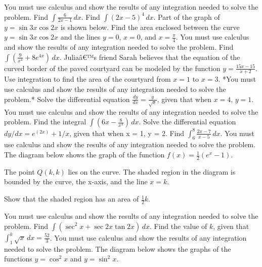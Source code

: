 \documentclass[12pt,addpoints]{exam}
\begin{document}
\begin{questions}
You must use calculus and show the results of any integration needed to solve the problem.
\fillwithlines{3cm}
\question[5] Find \(\int \frac{6}{2x-1} \, dx\).
\fillwithlines{3cm}
\question[5] Find \(\int (2x-5)^4 \, dx\).
\fillwithlines{3cm}
\question[5] Part of the graph of \( y = \sin 3x \cos 2x \) is shown below. Find the area enclosed between the curve \( y = \sin 3x \cos 2x \) and the lines \( y = 0 \), \( x = 0 \), and \( x = \frac{\pi}{4} \). You must use calculus and show the results of any integration needed to solve the problem.
\fillwithlines{3cm}
\question[5] Find \(\int \left( \frac{9}{x^4} + 8e^{4x} \right) \, dx\).
\fillwithlines{3cm}
\question[5] Juliaâ€™s friend Sarah believes that the equation of the curved border of the paved courtyard can be modeled by the function \( y = \frac{15x - 15}{x + 2} \). Use integration to find the area of the courtyard from \( x = 1 \) to \( x = 3 \). *You must use calculus and show the results of any integration needed to solve the problem.*
\fillwithlines{3cm}
\question[5] Solve the differential equation \(\frac{dy}{dx} = \frac{y}{\sqrt{x}}\), given that when \(x = 4\), \(y = 1\). You must use calculus and show the results of any integration needed to solve the problem.
\fillwithlines{3cm}
\question[5] Find the integral \(\int \left( 6x - \frac{8}{x^3} \right) \, dx\).
\fillwithlines{3cm}
\question[5] Solve the differential equation \(dy/dx = e^(2x) + 1/x\), given that when x = 1, y = 2.
\fillwithlines{3cm}
\question[5] Find \(\int_{6}^{8} \frac{2x - 7}{x - 5} \, dx\). You must use calculus and show the results of any integration needed to solve the problem.
\fillwithlines{3cm}
\question[5] The diagram below shows the graph of the function \( f(x) = \frac{1}{2} (e^x - 1) \).

The point \( Q(k, k) \) lies on the curve.  
The shaded region in the diagram is bounded by the curve, the x-axis, and the line \( x = k \).

Show that the shaded region has an area of \( \frac{1}{2} k \).

You must use calculus and show the results of any integration needed to solve the problem.
\fillwithlines{3cm}
\question[5] Find \(\int (\sec^2 x + \sec 2x \tan 2x) \, dx\).
\fillwithlines{3cm}
\question[5] Find the value of \( k \), given that \(\int_1^k \sqrt{x} \, dx = \frac{52}{3}\). You must use calculus and show the results of any integration needed to solve the problem.
\fillwithlines{3cm}
\question[5] The diagram below shows the graphs of the functions \( y = \cos^2 x \) and \( y = \sin^2 x \).


\end{questions}
\end{document}
